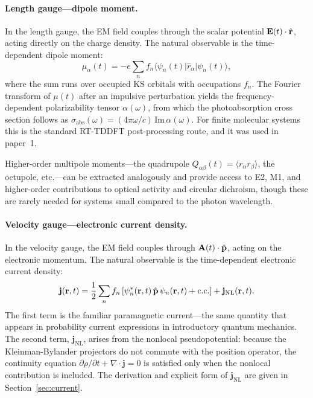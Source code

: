 \paragraph{Length gauge---dipole moment.}
In the length gauge, the EM field couples through the scalar
potential $\mathbf{E}(t)\cdot\hat{\mathbf{r}}$, acting directly on the
charge density.  The natural observable is the time-dependent dipole
moment:
\begin{equation}
  \mu_\alpha(t)
  = -e\sum_n f_n
    \langle\psi_n(t)|\hat{r}_\alpha|\psi_n(t)\rangle,
  \label{eq:dipole-moment}
\end{equation}
where the sum runs over occupied KS orbitals with occupations $f_n$.
The Fourier transform of $\mu(t)$ after an impulsive perturbation
yields the frequency-dependent polarizability tensor $\alpha(\omega)$,
from which the photoabsorption cross section follows as
$\sigma_\text{abs}(\omega) = (4\pi\omega/c)\,
\text{Im}\,\alpha(\omega)$.
For finite molecular systems this is the standard RT-TDDFT
post-processing route, and it was used in
paper~1.\cite{jakowski-tddft-2025}

Higher-order multipole moments---the quadrupole
$Q_{\alpha\beta}(t) = \langle r_\alpha r_\beta\rangle$, the
octupole, etc.---can be extracted analogously and provide access to
E2, M1, and higher-order contributions to optical activity and
circular dichroism, though these are rarely needed for systems small
compared to the photon wavelength.

\paragraph{Velocity gauge---electronic current density.}
In the velocity gauge, the EM field couples through
$\mathbf{A}(t)\cdot\hat{\mathbf{p}}$, acting on the electronic momentum.
The natural observable is the time-dependent electronic current
density:
\begin{equation}
  \mathbf{j}(\mathbf{r},t)
  = \frac{1}{2}\sum_n f_n
    \left[\psi_n^*(\mathbf{r},t)\,\hat{\mathbf{p}}\,\psi_n(\mathbf{r},t)
          + \text{c.c.}\right]
  + \mathbf{j}_\text{NL}(\mathbf{r},t).
  \label{eq:current-density}
\end{equation}
The first term is the familiar paramagnetic current---the same
quantity that appears in probability current expressions in
introductory quantum mechanics.
The second term, $\mathbf{j}_\text{NL}$, arises from the nonlocal
pseudopotential: because the Kleinman-Bylander projectors do not
commute with the position operator, the continuity equation
$\partial\rho/\partial t + \nabla\cdot\mathbf{j} = 0$ is satisfied
only when the nonlocal contribution is included.
The derivation and explicit form of $\mathbf{j}_\text{NL}$ are
given in Section~\ref{sec:current}.

